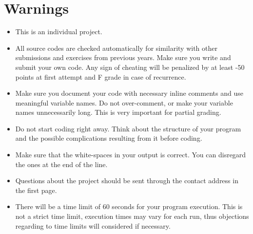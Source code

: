 \documentclass[10pt]{article}
\begin{document}
\section{Warnings}

\begin{itemize}

\item This is an individual project. 

\item All source codes are checked automatically for similarity with other submissions and exercises from previous years. Make sure you write and submit your own code. Any sign of cheating will be penalized by at least -50 points at first attempt and F grade in case of recurrence.

\item Make sure you document your code with necessary inline comments and use meaningful variable names. Do not over-comment, or make your variable names unnecessarily long. This is very important for partial grading.

\item Do not start coding right away. Think about the structure of your program and the possible complications resulting from it before coding.

\item Make sure that the white-spaces in your output is correct. You can disregard the ones at the end of the line.

\item Questions about the project should be sent through the contact address in the first page.

\item There will be a time limit of 60 seconds for your program execution. This is not a strict time limit, execution times may vary for each run, thus objections regarding to time limits will considered if necessary. 

\end{itemize}
\end{document}

